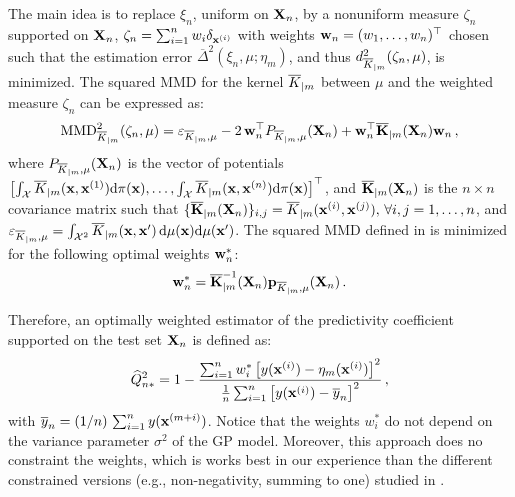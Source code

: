 The main idea is to replace $\xi_n$, uniform on ${\bf X}_n$, by a nonuniform measure $\zeta_n$ supported on ${\bf X}_n$, $\zeta_n = \sum_{i=1}^n w_i \delta_{{\bf x}^{(i)}}$ with weights $\mathbf{w}_n = (w_1,\ldots,w_n)^\top$ chosen such that the estimation error $\overline{\Delta}^2(\xi_n,\mu;\eta_m)$, and thus $d_{\overline{K}_{|m}}^2(\zeta_n,\mu)$, is minimized. 
The squared MMD for the kernel $\overline{K}_{|m}$ between $\mu$ and the weighted measure $\zeta_n$ can be expressed as:  
\begin{equation}
    \mathrm{MMD}_{\overline{K}_{|m}}^2(\zeta_n,\mu) = \varepsilon_{\overline{K}_{|m}, \mu} - 2\,\mathbf{w}_n^\top P_{\overline{K}_{|m}, \mu}({\bf X}_n) + \mathbf{w}_n^\top\overline{\mathbf{K}}_{|m}({\bf X}_n)\mathbf{w}_n \,,
    \label{eq:mmd2_validation}
\end{equation}
where $P_{\overline{K}_{|m}, \mu}({\bf X}_n)$ is the vector of potentials $\left[\int_{\mathcal{X}} \overline{K}_{|m}({\bf x}, {\bf x}^{(1)}) \mathrm{d} \pi({\bf x}), \dots, \int_{\mathcal{X}} \overline{K}_{|m}({\bf x}, {\bf x}^{(n)}) \mathrm{d} \pi({\bf x})\right]^\top$, 
and $\overline{\mathbf{K}}_{|m}({\bf X}_n)$ is the $n \times n$ covariance matrix such that $\{\overline{\mathbf{K}}_{|m}({\bf X}_n)\}_{i,j}=\overline{K}_{|m}({\bf x}^{(i)},{\bf x}^{(j)}), \, \forall i,j=1,\ldots,n$, 
and $\varepsilon_{\overline{K}_{|m}, \mu}=\int_{\mathcal{X}^2} \overline{K}_{|m}({\bf x},{\bf x}')\,\mathrm{d}\mu({\bf x})\mathrm{d}\mu({\bf x}')$.
%
The squared MMD defined in  is minimized for the following optimal weights $\mathbf{w}_n^*$: 
\begin{equation}
    \label{Eq:weights}
    \mathbf{w}_n^* = \overline{\mathbf{K}}_{|m}^{-1}({\bf X}_n)\mathbf{p}_{\overline{K}_{|m}, \mu}({\bf X}_n) \,.
\end{equation}

Therefore, an optimally weighted estimator of the predictivity coefficient supported on the test set ${\bf X}_n$ is defined as: 
\begin{equation}
    \widehat Q_{n*}^2 = 1 - \frac{\sum_{i=1}^n w_i^* \left[ y({\bf x}^{(i)})-\eta_m({\bf x}^{(i)})\right]^2}{\frac1n \sum_{i=1}^n \left[y({\bf x}^{(i)})-\overline{y}_n\right]^2} \,,
    \label{Q2-est*}
\end{equation}
with $\overline{y}_n=(1/n)\,\sum_{i=1}^n y({\bf x}^{(m+i)})$.
Notice that the weights $w_i^*$ do not depend on the variance parameter $\sigma^2$ of the GP model. 
Moreover, this approach does no constraint the weights, which is works best in our experience than the different constrained versions (e.g., non-negativity, summing to one) studied in \cite{PR2021a}. 

